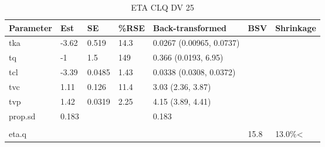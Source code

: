 \begin{table}
\centering\centering
\caption{ETA CLQ DV 25}
\centering
\fontsize{8}{10}\selectfont
\begin{tabular}[t]{lllllll}
\toprule
\textbf{Parameter} & \textbf{Est} & \textbf{SE} & \textbf{\%RSE} & \textbf{Back-transformed} & \textbf{BSV} & \textbf{Shrinkage}\\
\midrule
tka & -3.62 & 0.519 & 14.3 & 0.0267 (0.00965, 0.0737) &  & \\
\midrule
tq & -1 & 1.5 & 149 & 0.366 (0.0193, 6.95) &  & \\
\midrule
tcl & -3.39 & 0.0485 & 1.43 & 0.0338 (0.0308, 0.0372) &  & \\
\midrule
tvc & 1.11 & 0.126 & 11.4 & 3.03 (2.36, 3.87) &  & \\
\midrule
tvp & 1.42 & 0.0319 & 2.25 & 4.15 (3.89, 4.41) &  & \\
\midrule
prop.sd & 0.183 &  &  & 0.183 &  & \\
\midrule\\
eta.q &  &  &  &  & 15.8 & 13.0\%<\\
\bottomrule
\end{tabular}
\end{table}